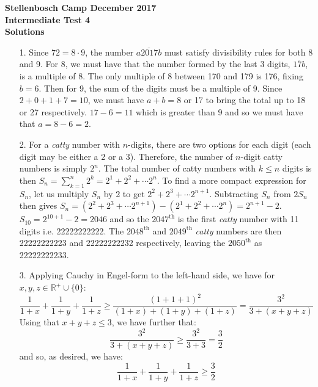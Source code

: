 \documentclass[a4paper,12pt]{article}
\begin{document}
\begin{center}
\textbf{Stellenbosch Camp December 2017 \\ Intermediate Test 4} \\
\textbf{Solutions}
\end{center}


\begin{enumerate}
    
    \item[1.] Since $72 = 8 \cdot 9$, the number $\overline{a2017b}$ must satisfy divisibility rules for both 8 and 9. For 8, we must have that the number formed by the last 3 digits, $\overline{17b}$, is a multiple of 8. The only multiple of 8 between 170 and 179 is 176, fixing $b=6$. Then for 9, the sum of the digits must be a multiple of 9. Since $2+0+1+7 = 10$, we must have $a+b=8$ or 17 to bring the total up to 18 or 27 respectively. $17-6 = 11$ which is greater than 9 and so we must have that $a=8-6=2$.
    
    
    \item[2.] For a \textit{catty} number with $n$-digits, there are two options for each digit (each digit may be either a 2 or a 3). Therefore, the number of $n$-digit catty numbers is simply $2^n$. The total number of catty numbers with $k\leq n$ digits is then $S_n = \sum_{k=1}^{n}2^k = 2^1+2^2+\cdots 2^n$. To find a more compact expression for $S_n$, let us multiply $S_n$ by 2 to get $2^2+2^3+\cdots 2^{n+1}$. Subtracting $S_n$ from $2S_n$ then gives $S_n = (2^2+2^3+\cdots 2^{n+1}) - (2^1+2^2+\cdots 2^n) = 2^{n+1}-2$. $S_{10} = 2^{10+1}-2 =2046$ and so the $2047^{\text{th}}$ is the first \textit{catty} number with 11 digits i.e. 22222222222. The $2048^{\text{th}}$ and $2049^{\text{th}}$ \textit{catty} numbers are then 22222222223 and 22222222232 respectively, leaving the $2050^{\text{th}}$ as 22222222233.
    
    \item[3.] Applying Cauchy in Engel-form to the left-hand side, we have for $x,y,z \in \mathbb{R}^+ \cup \{0\}$:
\begin{equation*}
\frac{1}{1+x}+\frac{1}{1+y}+\frac{1}{1+z} \geq \frac{(1+1+1)^2}{(1+x)+(1+y)+(1+z)} = \frac{3^2}{3+(x+y+z)}
\end{equation*}
Using that $x+y+z\leq 3$, we have further that:
\begin{equation*}
\frac{3^2}{3+(x+y+z)}\geq \frac{3^2}{3+3} = \frac{3}{2}
\end{equation*}
and so, as desired, we have:
\begin{equation*}
\frac{1}{1+x}+\frac{1}{1+y}+\frac{1}{1+z} \geq \frac{3}{2}
\end{equation*}



\end{enumerate}
\end{document}

